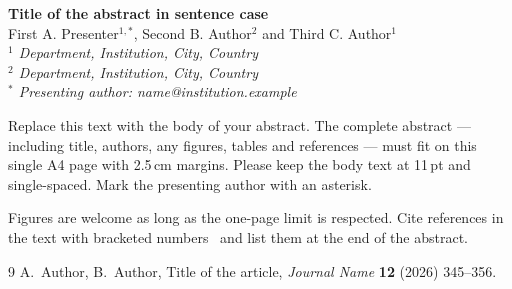 \documentclass[11pt,a4paper]{article}
\begin{document}
\begin{center}
  {\Large\bfseries Title of the abstract in sentence case}\\[0.8em]
  First A. Presenter$^{1,*}$, Second B. Author$^{2}$ and Third C. Author$^{1}$\\[0.4em]
  {\small\itshape
    $^{1}$ Department, Institution, City, Country\\
    $^{2}$ Department, Institution, City, Country\\
    $^{*}$ Presenting author: name@institution.example}
\end{center}

\vspace{0.5em}

Replace this text with the body of your abstract. The complete abstract ---
including title, authors, any figures, tables and references --- must fit on
this single A4 page with 2.5\,cm margins. Please keep the body text at 11\,pt
and single-spaced. Mark the presenting author with an asterisk.

Figures are welcome as long as the one-page limit is respected. Cite
references in the text with bracketed numbers~\cite{example} and list them at
the end of the abstract.


\begin{thebibliography}{9}\small
   A.~Author, B.~Author, Title of the article,
  \emph{Journal Name} \textbf{12} (2026) 345--356.
\end{thebibliography}
\end{document}
